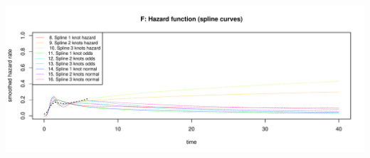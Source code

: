 \documentclass[]{article}
\begin{document}
\begin{flushleft}\includegraphics[height=0.29\textheight]{Images/validate_extrapolation2-6} \end{flushleft}

\begin{table}


\end{table}
\end{document}
